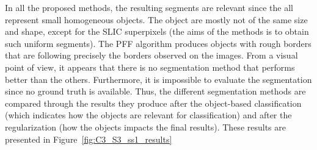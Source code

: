 In all the proposed methods, the resulting segments are relevant since the all represent small homogeneous objects. The object are mostly not of the same size and shape, except for the SLIC superpixels (the aims of the methods is to obtain such uniform segments). The PFF algorithm produces objects with rough borders that are following precisely the borders observed on the images. From a visual point of view, it appears that there is no segmentation method that performs better than the others. Furthermore, it is impossible to evaluate the segmentation since no ground truth is available. Thus, the different segmentation methods are compared through the results they produce after the object-based classification (which indicates how the objects are relevant for classification) and after the regularization (how the objects impacts the final results). These results are presented in Figure~\ref{fig:C3_S3_ss1_results}\\

